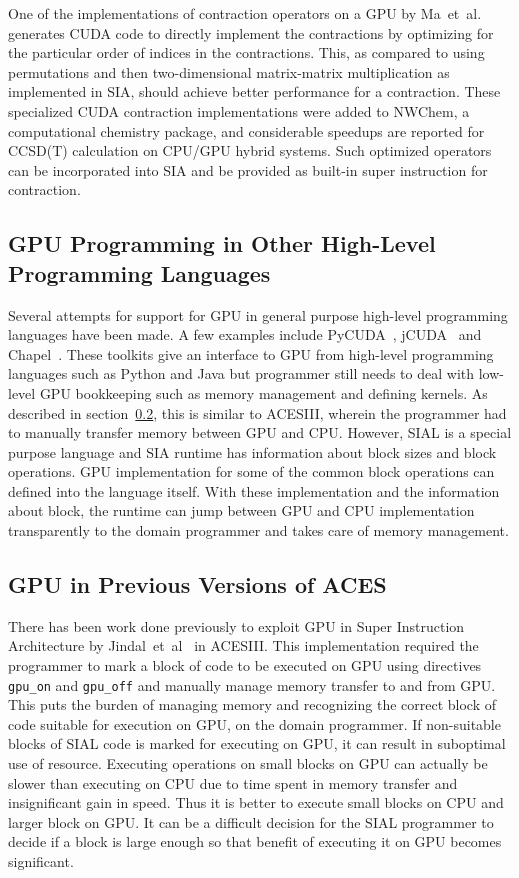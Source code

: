 One of the implementations of contraction operators on a GPU by
Ma~et~al.~\cite{Ma2013} generates CUDA code to directly implement the contractions
by optimizing for the particular order of indices in the contractions. This, as
compared to using permutations and then two-dimensional matrix-matrix multiplication
as implemented in SIA, should achieve better performance for a contraction. These
specialized CUDA contraction implementations were added to NWChem, a computational
chemistry package, and considerable speedups are reported for CCSD(T) calculation
on CPU/GPU hybrid systems. Such optimized operators can be incorporated into SIA
and be provided as built-in super instruction for contraction.

\subsection{GPU Programming in Other High-Level Programming Languages}
Several attempts for support for GPU in general purpose high-level programming
languages have been made. A few examples include PyCUDA~\cite{pycuda2011},
jCUDA~\cite{jcuda2009} and Chapel~\cite{chapelgpu}. These toolkits give an interface
to GPU from high-level programming languages such as Python and Java but
programmer still needs to deal with low-level GPU bookkeeping such as memory
management and defining kernels. As described in section~\ref{relatedworkacesiiigpu},
this is similar to ACESIII, wherein the programmer had to manually transfer memory
between GPU and CPU. However, SIAL is a special purpose language and SIA runtime
has information about block sizes and block operations. GPU implementation for
some of the common block operations can defined into the language itself. With
these implementation and the information about block, the runtime can jump between
GPU and CPU implementation transparently to the domain programmer and takes care
of memory management.

\subsection{GPU in Previous Versions of ACES}\label{relatedworkacesiiigpu}
There has been work done previously to exploit GPU in Super Instruction
Architecture by Jindal~et~al~\cite{Jindal2016} in ACESIII. This implementation
required the programmer to mark a block of code to be executed on GPU using
directives \texttt{gpu\_on} and \texttt{gpu\_off} and manually manage memory
transfer to and from GPU. This puts the burden of managing memory and recognizing
the correct block of code suitable for execution on GPU, on the domain programmer.
If non-suitable blocks of SIAL code is marked for executing on GPU, it can result
in suboptimal use of resource. Executing operations on small blocks on GPU can
actually be slower than executing on CPU due to time spent in memory transfer and
insignificant gain in speed. Thus it is better to execute small blocks on CPU and
larger block on GPU. It can be a difficult decision for the SIAL programmer to decide
if a block is large enough so that benefit of executing it on GPU becomes significant.

